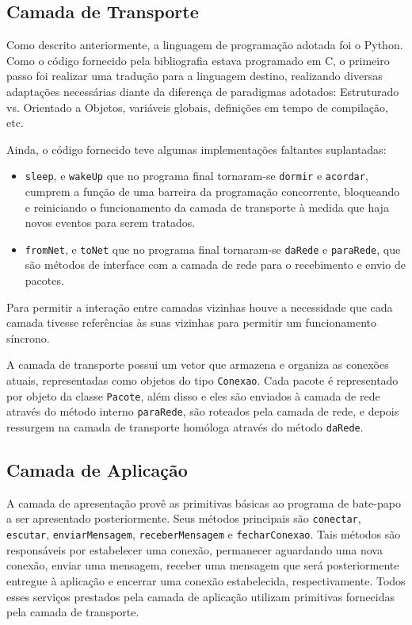 \documentclass[brazil,times,12pt]{abnt}
\begin{document}
\subsection*{Camada de Transporte}
	Como descrito anteriormente, a linguagem de programação adotada foi o Python.
	Como o código fornecido pela bibliografia estava programado em C, o primeiro
	passo foi realizar uma tradução para a linguagem destino, realizando diversas
	adaptações necessárias diante da diferença de paradigmas adotados: Estruturado
	vs. Orientado a Objetos, variáveis globais, definições em tempo de compilação,
	etc.
	
	Ainda, o código fornecido teve algumas implementações faltantes suplantadas:
	
	\begin{itemize}
  		\item \texttt{sleep}, e \texttt{wakeUp} que no programa final tornaram-se
  		\texttt{dormir} e \texttt{acordar}, cumprem a função de uma barreira da
  		programação concorrente, bloqueando e reiniciando o funcionamento da camada
  		de transporte à medida que haja novos eventos para serem tratados.
  		\item \texttt{fromNet}, e \texttt{toNet} que no programa final tornaram-se
  		\texttt{daRede} e \texttt{paraRede}, que são métodos de interface com a
  		camada de rede para o recebimento e envio de pacotes.
	\end{itemize}
	
	Para permitir a interação entre camadas vizinhas houve a necessidade que cada
	camada tivesse referências às suas vizinhas para permitir um funcionamento
	síncrono.
	
	A camada de transporte possui um vetor que armazena e organiza as conexões
	atuais, representadas como objetos do tipo \texttt{Conexao}. Cada pacote é
	representado por objeto da classe \texttt{Pacote}, além disso e eles são
	enviados à camada de rede através do método interno \texttt{paraRede}, são
	roteados pela camada de rede, e depois ressurgem na camada de transporte
	homóloga através do método \texttt{daRede}.


\subsection*{Camada de Aplicação}
	A camada de apresentação provê as primitivas básicas ao programa de bate-papo a
	ser apresentado posteriormente. Seus métodos principais são \texttt{conectar}, \texttt{escutar},
	\texttt{enviarMensagem}, \texttt{receberMensagem} e \texttt{fecharConexao}.
	Tais métodos são responsáveis por estabelecer uma conexão, permanecer
	aguardando uma nova conexão, enviar uma mensagem, receber uma mensagem que será
	posteriormente entregue à aplicação e encerrar uma conexão estabelecida,
	respectivamente. Todos esses serviços prestados pela camada de aplicação
	utilizam primitivas fornecidas pela camada de transporte.
	
\end{document}
